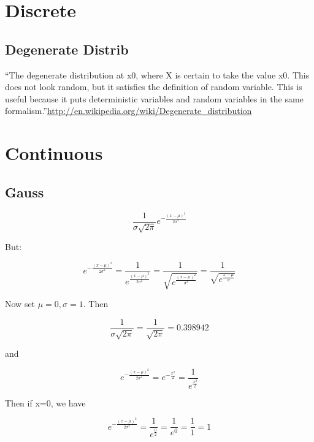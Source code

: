 \section{Discrete}

\subsection{Degenerate Distrib}

``The degenerate distribution at x0, where X is certain to take the
value x0. This does not look random, but it satisfies the definition
of random variable. This is useful because it puts deterministic
variables and random variables in the same
formalism.''\url{http://en.wikipedia.org/wiki/Degenerate_distribution}

\section{Continuous}
\subsection{Gauss}

\begin{equation}
  \frac{1}{\sigma\sqrt{2\pi}}e^{-\frac{(x-\mu)^2}{2\sigma^2}}
\end{equation}

But:

\begin{equation}
  e^{-\frac{(x-\mu)^2}{2\sigma^2}} = \frac{1}{e^\frac{(x-\mu)^2}{2\sigma^2}} =
  \frac{1}{\sqrt{e^{\frac{(x-\mu)^2}{\sigma^2}}}} =
  \frac{1}{\sqrt{e^{\frac{x-\mu}{\sigma}}}}
\end{equation}

Now set $\mu=0, \sigma=1$.  Then

\begin{equation}
  \frac{1}{\sigma\sqrt{2\pi}} = \frac{1}{\sqrt{2\pi}} = 0.398942
\end{equation}

and

\begin{equation}
  e^{-\frac{(x-\mu)^2}{2\sigma^2}} =
  e^{-\frac{x^2}{2}} =
  \frac{1}{e^\frac{x^2}{2}}
\end{equation}

Then if x=0, we have

\begin{equation}
  e^{-\frac{(x-\mu)^2}{2\sigma^2}} =
  \frac{1}{e^\frac{0}{2}} =
  \frac{1}{e^0} = \frac{1}{1} = 1
\end{equation}

